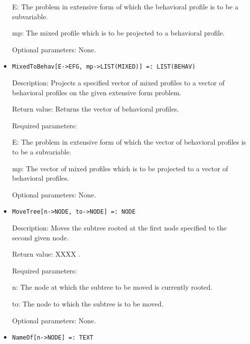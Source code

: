 \begin{itemize}
\bd
\item
[ E:] The problem in extensive form of which the behavioral profile
is to be a subvariable.
\item
[ mp:] The mixed profile which is to be projected to a behavioral
profile.
\ed

\item
[Optional parameters:] None.
\ed

\item
\protect \large \begin{verbatim}
MixedToBehav[E->EFG, mp->LIST(MIXED)] =: LIST(BEHAV)
\end{verbatim}\normalsize

\bd
\item
[Description:] Projects a specified vector of mixed profiles to a vector
of behavioral profiles on the given extensive form problem.
\item
[Return value:] Returns the vector of behavioral profiles.
\item
[Required parameters:]\hfil\null

\bd
\item
[ E:] The problem in extensive form of which the vector of 
behavioral profiles is to be a subvariable.
\item
[ mp:] The vector of mixed profiles which is to be projected to a 
vector of behavioral profiles.
\ed

\item
[Optional parameters:] None.
\ed

\item
\protect \large \begin{verbatim}
MoveTree[n->NODE, to->NODE] =: NODE
\end{verbatim}\normalsize

\bd
\item
[Description:] Moves the subtree rooted at the first node specified to
the second given node.
\item
[Return value:] XXXX .
\item
[Required parameters:]\hfil\null
	  
\bd
\item
[ n:] The node at which the subtree to be moved is currently rooted.
\item
[ to:] The node to which the subtree is to be moved.
\ed

\item
[Optional parameters:] None.
\ed

\item
\protect \large \begin{verbatim}
NameOf[n->NODE] =: TEXT
\end{verbatim}\normalsize


\end{itemize}
